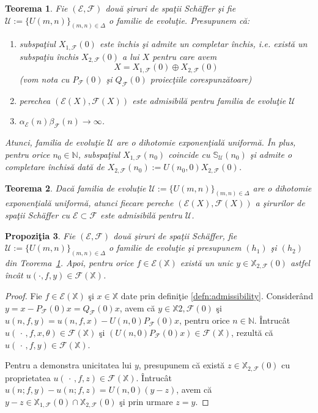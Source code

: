 \documentclass[ a4paper, 12pt]{report}
\newcommand{\E}{\mathcal{E}}
\newcommand{\F}{\mathcal{F}}
\newcommand{\N}{\mathbb{N}}
\newcommand{\X}{\mathbb{X}}
\newtheorem{theorem}{\bf Teorema}[section]
\newtheorem{prop}[theorem]{\bf Propozi\c tia }
\theoremstyle{definition}
\theoremstyle{remark}
\numberwithin{equation}{section}
\begin{document}
\begin{theorem}
\label{artC:mainthm}
Fie $(\E,\F)$ dou\u a \c siruri de spa\c tii Sch\"{a}ffer \c si fie \\ $\mathcal{U}:=\{U(m,n)\}_{(m,n)\in\Delta}$ o familie de evolu\c tie.
Presupunem c\u a:
\begin{enumerate}
\item[$(h_1)$] subspa\c tiul $X_{1,\F}(0)$ este \^inchis \c si admite un completar \^inchis,
 i.e. exist\u a un subspa\c tiu \^inchis $X_{2,\F}(0)$ a lui $X$ pentru care avem
 $$X=X_{1,\F}(0)\oplus X_{2,\F}(0)$$
 (vom nota cu $P_{\F}(0)$ \c si $Q_{\F}(0)$ proiec\c tiile corespunz\u atoare)
\item[$(h_2)$] perechea $(\E(X),\F(X))$ este admisibil\u a pentru familia de evolu\c tie $\mathcal{U}$
\item[$(h_3)$] $\alpha_{\E}(n)\beta_{\F}(n) \to\infty$.
\end{enumerate}
Atunci, familia de evolu\c tie $\mathcal{U}$ are o dihotomie exponen\c tial\u a uniform\u a. \^In plus,
pentru orice $n_0\in\N$, subspa\c tiul $X_{1,\F}(n_0)$ coincide cu $\mathbb{S}_{\mathcal{U}}(n_0)$
\c si admite o completare \^inchis\u a dat\u a de  $X_{2,\F}(n_0):=U(n_0,0)X_{2,\F}(0)$.
\end{theorem}


\begin{theorem}
\label{artC:conversemainthm}
Dac\u a familia de evolu\c tie $\mathcal{U}:=\{U(m,n)\}_{(m,n)\in\Delta}$ are o dihotomie exponen\c tial\u a uniform\u a, atunci
fiecare pereche $(\E(X),\F(X))$ a \c sirurilor de spa\c tii Sch\"{a}ffer cu $\E\subset\F$
este admisibil\u a pentru $\mathcal{U}$.
\end{theorem}

\begin{prop}
\label{artC:unicity}
Fie $(\E,\F)$ dou\u a \c siruri de spa\c tii Sch\"{a}ffer,
fie $\mathcal{U}:=\{U(m,n)\}_{(m,n)\in\Delta}$ o familie de evolu\c tie \c si
presupunem $(h_1)$ \c si $(h_2)$ din Teorema~\ref{artC:mainthm}.
Apoi, pentru orice $f\in\E(\X)$ exist\u a un unic $y\in\X_{2,\F}(0)$ astfel \^inc\^at
$u(\cdot,f,y)\in\F(\X)$.
\end{prop}
\begin{proof}
Fie $f\in \E(\X)$ \c si $x\in\X$ date prin defini\c tie \ref{defn:admissibility}.
Consider\^and $y=x-P_{\F}(0)x=Q_{\F}(0)x$, avem c\u a $y\in\X{2,\F}(0)$ \c si
$u(n,f,y)=u(n,f,x)- U(n,0)P_{\F}(0)x$, pentru orice $n\in\N$.
\^Intruc\^at $u(\,\cdot\,,f,x,\theta)\in\F(\X)$ \c si $(U(n,0)P_{\F}(0)x)\in\F(\X)$,
rezult\u a c\u a $u(\,\cdot\,,f,y)\in\F(\X)$.

Pentru a demonstra unicitatea lui $y$, presupunem c\u a exist\u a $z\in\X_{2,\F}(0)$ cu proprietatea
$u(\,\cdot\,,f,z)\in\F(\X)$.
\^Intruc\^at $u(n;f,y)-u(n;f,z)=U(n,0)(y-z)$,
avem c\u a $y-z\in\X_{1,\F}(0)\cap\X_{2,\F}(0)$ \c si prin urmare $z=y$.

\end{proof}
\end{document}
